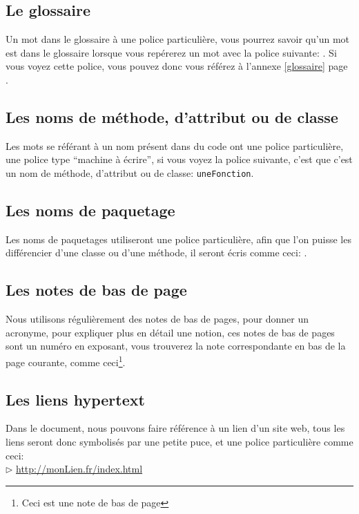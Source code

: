 \subsection*{Le glossaire}
Un mot dans le glossaire à une police particulière, vous pourrez savoir qu'un mot est dans le glossaire lorsque vous repérerez un mot avec la police suivante: 
. Si vous voyez cette police, vous pouvez donc vous référez à l'annexe \ref{glossaire} page \pageref{glossaire}.
\subsection*{Les noms de méthode, d'attribut ou de classe}
Les mots se référant à un nom présent dans du code ont une police particulière, une police type ``machine à écrire'', si vous voyez la police suivante, c'est que c'est un nom 
de méthode, d'attribut ou de classe: \texttt{uneFonction}.
\subsection*{Les noms de paquetage}
Les noms de paquetages utiliseront une police particulière, afin que l'on puisse les différencier d'une classe ou d'une méthode, il seront écris 
comme ceci: .
\subsection*{Les notes de bas de page}
Nous utilisons régulièrement des notes de bas de pages, pour donner un acronyme, pour expliquer plus en détail une notion, ces notes de bas de pages sont un numéro
en exposant, vous trouverez la note correspondante en bas de la page courante, comme ceci\footnote{Ceci est une note de bas de page}.
\subsection*{Les liens hypertext}
Dans le document, nous pouvons faire référence à un lien d'un site web, tous les liens seront donc symbolisés par une petite puce, et une police particulière comme ceci:\\
	$\rhd$ \url{http://monLien.fr/index.html}\\

